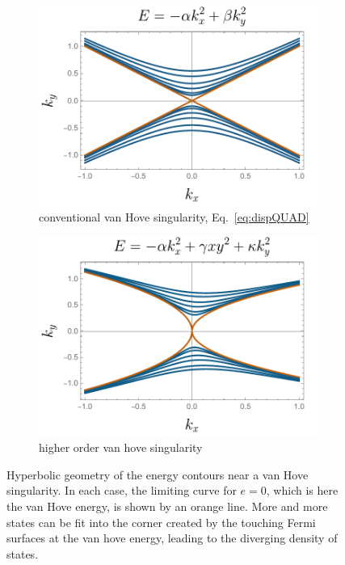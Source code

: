 \begin{figure}[h]
    \centering
    \begin{subfigure}[t]{0.45\linewidth}
        \centering
        \includegraphics[width=\textwidth]{figures/introduction/logcontours.pdf}
        \caption{\centering conventional van Hove singularity, Eq.~\eqref{eq:dispQUAD}}
        \label{fig:logcontours}
    \end{subfigure}
    \hfill
    \begin{subfigure}[t]{0.45\linewidth}
        \centering
        \includegraphics[width=\textwidth]{figures/introduction/paracontours.pdf}
        \caption{\centering higher order van hove singularity}
        \label{fig:paracontours}
    \end{subfigure}
    \hfill
    \caption{Hyperbolic geometry of the energy contours near a van Hove singularity. In each case, the limiting curve for $e=0$, which is here the van Hove energy, is shown by an orange line. More and more states can be fit into the corner created by the touching Fermi surfaces at the van hove energy, leading to the diverging density of states.}
    \label{fig:vanHoveillustration}
\end{figure}

